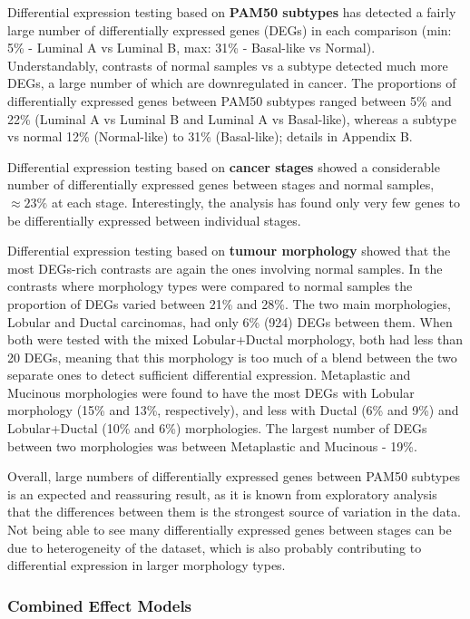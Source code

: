         Differential expression testing based on \textbf{PAM50 subtypes} has detected a fairly large number of differentially expressed genes (DEGs) in each comparison (min: 5\% - Luminal A vs Luminal B, max: 31\% - Basal-like vs Normal). Understandably, contrasts of normal samples vs a subtype detected much more DEGs, a large number of which are downregulated in cancer. The proportions of differentially expressed genes between PAM50 subtypes ranged between 5\% and 22\% (Luminal A vs Luminal B and Luminal A vs Basal-like), whereas a subtype vs normal 12\% (Normal-like) to 31\% (Basal-like); details in Appendix B. 
        
        Differential expression testing based on \textbf{cancer stages} showed a considerable number of differentially expressed genes between stages and normal samples, $\approx 23\%$ at each stage. Interestingly, the analysis has found only very few genes to be differentially expressed between individual stages.
        
        Differential expression testing based on \textbf{tumour morphology }showed that the most DEGs-rich contrasts are again the ones involving normal samples. In the contrasts where morphology types were compared to normal samples the proportion of DEGs varied between 21\% and 28\%. The two main morphologies, Lobular and Ductal carcinomas,  had only 6\% (924) DEGs between them. When both were tested with the mixed Lobular+Ductal morphology, both had less than 20 DEGs, meaning that this morphology is too much of a blend between the two separate ones to detect sufficient differential expression. Metaplastic and Mucinous morphologies were found to have the most DEGs with Lobular morphology (15\% and 13\%, respectively), and less with Ductal (6\% and 9\%) and Lobular+Ductal (10\% and 6\%) morphologies. The largest number of DEGs between two morphologies was between Metaplastic and Mucinous - 19\%. 
        
        Overall, large numbers of differentially expressed genes between PAM50 subtypes is an expected and reassuring result, as it is known from exploratory analysis that the differences between them is the strongest source of variation in the data. Not being able to see many differentially expressed genes between stages can be due to heterogeneity of the dataset, which is also probably contributing to differential expression in larger morphology types. 
        
        
        \subsubsection{Combined Effect Models}
        
